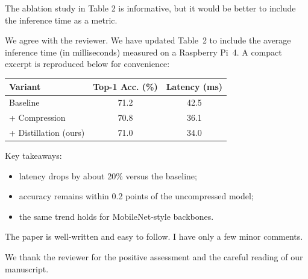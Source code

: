 \documentclass{ar2rc}
\begin{document}
\begin{reviewerblock}
\begin{reviewercomment}
\label{com2.2}
The ablation study in Table 2 is informative, but it would be better to include
the inference time as a metric.
\end{reviewercomment}
\begin{reviewerresponse}
We agree with the reviewer. We have updated Table~2 to include the average
inference time (in milliseconds) measured on a Raspberry Pi~4. A compact
excerpt is reproduced below for convenience:

\begin{center}
  \label{tab:demo-ablation}
  \begin{tabular}{@{}lcc@{}}
    \toprule
    Variant & Top-1 Acc. (\%) & Latency (ms) \\
    \midrule
    Baseline & 71.2 & 42.5 \\
    + Compression & 70.8 & 36.1 \\
    + Distillation (ours) & 71.0 & 34.0 \\
    \bottomrule
  \end{tabular}
\end{center}

Key takeaways:
\begin{itemize}
  \item latency drops by about 20\% versus the baseline;
  \item accuracy remains within 0.2 points of the uncompressed model;
  \item the same trend holds for MobileNet-style backbones.
\end{itemize}
\end{reviewerresponse}
\end{reviewerblock}

\resetcommentcounter

\begin{generalblock}
\begin{generalcomment}
\label{com3.0}
The paper is well-written and easy to follow. I have only a few minor comments.
\end{generalcomment}
\begin{generalresponse}
We thank the reviewer for the positive assessment and the careful reading of our
manuscript.
\end{generalresponse}
\end{generalblock}
\end{document}
